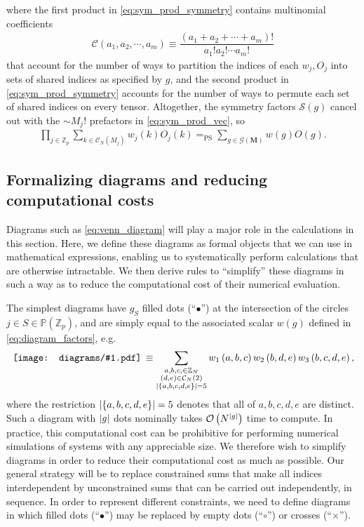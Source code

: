 \documentclass[nofootinbib,notitlepage,11pt]{revtex4-2}
\newcommand{\f}[2]{\dfrac{#1}{#2}} %
\newcommand{\p}[1]{\left(#1\right)} %
\renewcommand{\set}[1]{\left\{#1\right\}} %
\newcommand{\m}{\bm} %
\newcommand{\1}{\mathds{1}}
\newcommand{\C}{\mathcal{C}}
\newcommand{\G}{\mathcal{G}}
\renewcommand{\O}{\mathcal{O}}
\renewcommand{\S}{\mathcal{S}}
\newcommand{\PP}{\mathbb{P}}
\newcommand{\ZZ}{\mathbb{Z}}
\newcommand{\EQPS}{=_{\text{PS}}}
\newcommand{\diagram}[1]
{\,\texttt{[image: diagrams/\#1.pdf]}\,}
\begin{document}
where the first product in \eqref{eq:sym_prod_symmetry} contains
multinomial coefficients
\begin{align}
  \C\p{a_1,a_2,\cdots,a_m}
  \equiv \f{\p{a_1+a_2+\cdots+a_m}!}{a_1!a_2!\cdots a_m!}
\end{align}
that account for the number of ways to partition the indices of each
$w_j,O_j$ into sets of shared indices as specified by $g$, and the
second product in \eqref{eq:sym_prod_symmetry} accounts for the number
of ways to permute each set of shared indices on every tensor.
Altogether, the symmetry factors $\S\p{g}$ cancel out with the
$\sim M_j!$ prefactors in \eqref{eq:sym_prod_vec}, so
\begin{align}
  \prod_{j\in\ZZ_p} \sum_{k\in\C_N\p{M_j}} w_j\p{k} O_j\p{k}
  \EQPS \sum_{g\in\G\p{\m M}} w\p{g} O\p{g}.
  \label{eq:sym_prod_group}
\end{align}

\subsection{Formalizing diagrams and reducing computational costs}
\label{sec:diagrams}

Diagrams such as \eqref{eq:venn_diagram} will play a major role in the
calculations in this section.  Here, we define these diagrams as
formal objects that we can use in mathematical expressions, enabling
us to systematically perform calculations that are otherwise
intractable.  We then derive rules to ``simplify'' these diagrams in
such a way as to reduce the computational cost of their numerical
evaluation.

The simplest diagrams have $g_S$ filled dots (``$\bullet$'') at the
intersection of the circles $j\in S\in\PP\p{\ZZ_p}$, and are simply
equal to the associated scalar $w\p{g}$ defined in
\eqref{eq:diagram_factors}, e.g.
\begin{align}
  \diagram{example_123}
  \equiv \sum_{\substack{a,b,c,\in\ZZ_N\\\p{d,e}\in\C_N\p{2}\\
      \abs{\set{a,b,c,d,e}}=5}}
  w_1\p{a,b,c} w_2\p{b,d,e} w_3\p{b,c,d,e},
\end{align}
where the restriction $\abs{\set{a,b,c,d,e}}=5$ denotes that all of
$a,b,c,d,e$ are distinct.  Such a diagram with $\abs{g}$ dots
nominally takes $\O\p{N^{\abs{g}}}$ time to compute.  In practice,
this computational cost can be prohibitive for performing numerical
simulations of systems with any appreciable size.  We therefore wish
to simplify diagrams in order to reduce their computational cost as
much as possible.  Our general strategy will be to replace constrained
sums that make all indices interdependent by unconstrained sums that
can be carried out independently, in sequence.  In order to represent
different constraints, we need to define diagrams in which filled dots
(``$\bullet$'') may be replaced by empty dots (``$\circ$'') or crosses
(``$\bm\times$'').
\end{document}
